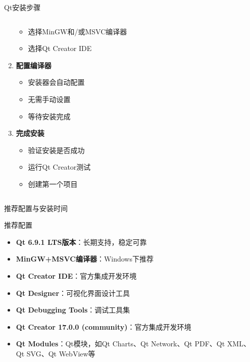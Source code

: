 \documentclass[UTF8,aspectratio=169]{beamer}
\begin{document}
\begin{frame}[fragile]{Qt安装步骤}
\begin{columns}
\begin{column}{0.48\textwidth}
\begin{enumerate}
\begin{itemize}
                        \item 选择MinGW和/或MSVC编译器
                        \item 选择Qt Creator IDE
                    \end{itemize}
                \item \textbf{配置编译器}
                    \begin{itemize}
                        \item 安装器会自动配置
                        \item 无需手动设置
                        \item 等待安装完成
                    \end{itemize}
                \item \textbf{完成安装}
                    \begin{itemize}
                        \item 验证安装是否成功
                        \item 运行Qt Creator测试
                        \item 创建第一个项目
                    \end{itemize}
            \end{enumerate}
        \end{column}
    \end{columns}
\end{frame}

\begin{frame}{推荐配置与安装时间}
    \begin{ytublock}{推荐配置}
        \begin{itemize}
            \item \textbf{Qt 6.9.1 LTS版本}：长期支持，稳定可靠
            \item \textbf{MinGW+MSVC编译器}：Windows下推荐
            \item \textbf{Qt Creator IDE}：官方集成开发环境
            \item \textbf{Qt Designer}：可视化界面设计工具
            \item \textbf{Qt Debugging Tools}：调试工具集
            \item \textbf{Qt Creator 17.0.0 (community)}：官方集成开发环境
            \item \textbf{Qt Modules}：Qt模块，如Qt Charts、Qt Network、Qt PDF、Qt XML、Qt SVG、Qt WebView等
        \end{itemize}
    \end{ytublock}
\end{frame}
\end{document}
